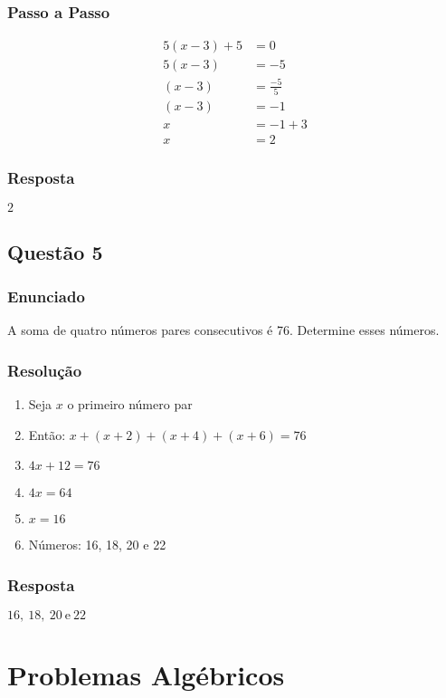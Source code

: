 \documentclass[11pt]{article}
\begin{document}
\subsubsection*{Passo a Passo}
\begin{align*}
5(x - 3) + 5 &= 0\\
5(x - 3)  &= -5 \\
(x - 3) &= \frac{-5}{5} \\
(x - 3) &= -1 \\
x &= -1 + 3 \\
x &= 2 
\end{align*}

\subsubsection*{Resposta}
$\boxed{2}$

\subsection{Questão 5}
\subsubsection*{Enunciado}
A soma de quatro números pares consecutivos é 76. Determine esses números.

\subsubsection*{Resolução}
\begin{enumerate}
\item Seja $x$ o primeiro número par
\item Então: $x + (x+2) + (x+4) + (x+6) = 76$
\item $4x + 12 = 76$
\item $4x = 64$
\item $x = 16$
\item Números: 16, 18, 20 e 22
\end{enumerate}

\subsubsection*{Resposta}
$\boxed{16,\ 18,\ 20\ \text{e}\ 22}$

\section{Problemas Algébricos}
\end{document}
